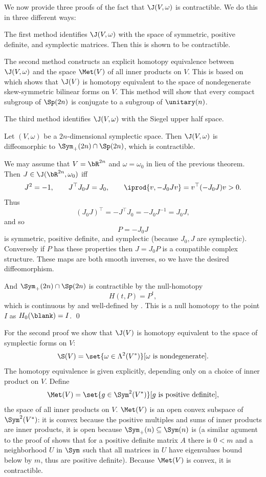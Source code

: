 \eproof

We now provide three proofs of the fact that $\J(V,\omega)$ is contractible.
We do this in three different ways:
\benum
    \item The first method identifies $\J(V,\omega)$ with the space of symmetric, positive definite, and symplectic matrices.
    Then this is shown to be contractible.

    \item The second method constructs an explicit homotopy equivalence between $\J(V,\omega)$ and the space $\Met(V)$ of all inner products
    on $V$.
    This is based on  which shows that $\J(V)$ is homotopy equivalent to the space of nondegenerate
    skew-symmetric bilinear forms on $V$.
    This method will show that every compact subgroup of $\Sp(2n)$ is conjugate to a subgroup of $\unitary(n)$.

    \item The third method identifies $\J(V,\omega)$ with the Siegel upper half space.
\eenum

\bprop

    Let $(V,\omega)$ be a $2n$-dimensional symplectic space.
    Then $\J(V,\omega)$ is diffeomorphic to $\Sym_+(2n)\cap\Sp(2n)$, which is contractible.

\eprop

\bproof

    We may assume that $V=\bR^{2n}$ and $\omega=\omega_0$ in lieu of the previous theorem.
    Then $J\in\J(\bR^{2n},\omega_0)$ iff
    $$ J^2 = -1,\qquad J^\top J_0J = J_0,\qquad \iprod{v,-J_0Jv} = v^\top(-J_0J)v > 0 . $$
    Thus
    $$ (J_0J)^\top = -J^\top J_0 = -J_0J^{-1} = J_0J , $$
    and so
    $$ P = -J_0J $$
    is symmetric, positive definite, and symplectic (because $J_0,J$ are symplectic).
    Conversely if $P$ has these properties then $J=J_0P$ is a compatible complex structure.
    These maps are both smooth inverses, so we have the desired diffeomorphism.

    And $\Sym_+(2n)\cap\Sp(2n)$ is contractible by the null-homotopy
    $$ H(t,P) = P^t , $$
    which is continuous by  and well-defined by .
    This is a null homotopy to the point $I$ as $H_0(\blank)=I$.
    \qed

\eproof

For the second proof we show that $\J(V)$ is homotopy equivalent to the space of symplectic forms on $V$:
$$ \S(V) = \set{\omega\in\Lambda^2(V^*)}[\hbox{$\omega$ is nondegenerate}] . $$
The homotopy equivalence is given explicitly, depending only on a choice of inner product on $V$.
Define
$$ \Met(V) = \set{g\in\Sym^2(V^*)}[\hbox{$g$ is positive definite}] , $$
the space of all inner products on $V$.
$\Met(V)$ is an open convex subspace of $\Sym^2(V^*)$: it is convex because the positive multiples and sums of inner products are inner products,
it is open because $\Sym_+(n)\subseteq\Sym(n)$ is (a similar agument to the proof of  shows that for a positive definite
matrix $A$ there is $0<m$ and a neighborhood $U$ in $\Sym$ such that all matrices in $U$ have eigenvalues bound below by $m$, thus are
positive definite).
Because $\Met(V)$ is convex, it is contractible.

